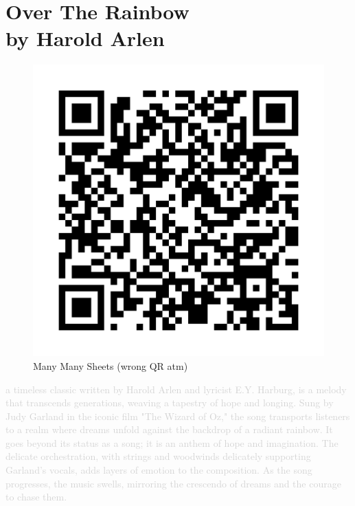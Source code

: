 \chapter[Over The Rainbow]{Over The Rainbow\\[1ex]\large{by Harold Arlen}}

\begin{figure}
\includegraphics[width=1\linewidth]{QR_Codes/QR_SultansOfSwing_BassChords.png}\\
Many Many Sheets (wrong QR atm)
\end{figure}

\textcolor{lightgray}{a timeless classic written by Harold Arlen and lyricist E.Y. Harburg, is a melody that transcends generations, weaving a tapestry of hope and longing. Sung by Judy Garland in the iconic film "The Wizard of Oz," the song transports listeners to a realm where dreams unfold against the backdrop of a radiant rainbow.
It goes beyond its status as a song; it is an anthem of hope and imagination. The delicate orchestration, with strings and woodwinds delicately supporting Garland's vocals, adds layers of emotion to the composition. As the song progresses, the music swells, mirroring the crescendo of dreams and the courage to chase them.}\\
